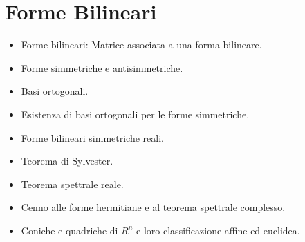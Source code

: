 \section{Forme Bilineari}
\begin{itemize}
	\item Forme bilineari: Matrice associata a una forma bilineare. 
	\item Forme simmetriche e antisimmetriche. 
	\item Basi ortogonali. 
	\item Esistenza di basi ortogonali per le forme simmetriche. 
	\item Forme bilineari simmetriche reali. 
	\item Teorema di Sylvester. 
	\item Teorema spettrale reale. 
	\item Cenno alle forme hermitiane e al teorema spettrale complesso.  
	\item Coniche e quadriche di $R^n$ e loro classificazione affine ed euclidea.
\end{itemize}